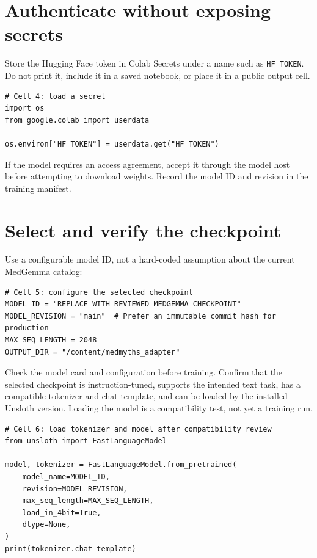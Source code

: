 \documentclass[11pt,oneside]{book}
\begin{document}
\section{Authenticate without exposing secrets}

Store the Hugging Face token in Colab Secrets under a name such as \texttt{HF\_TOKEN}. Do not print it, include it in a saved notebook, or place it in a public output cell.

\begin{verbatim}
# Cell 4: load a secret
import os
from google.colab import userdata

os.environ["HF_TOKEN"] = userdata.get("HF_TOKEN")
\end{verbatim}

If the model requires an access agreement, accept it through the model host before attempting to download weights. Record the model ID and revision in the training manifest.

\section{Select and verify the checkpoint}

Use a configurable model ID, not a hard-coded assumption about the current MedGemma catalog:

\begin{verbatim}
# Cell 5: configure the selected checkpoint
MODEL_ID = "REPLACE_WITH_REVIEWED_MEDGEMMA_CHECKPOINT"
MODEL_REVISION = "main"  # Prefer an immutable commit hash for production
MAX_SEQ_LENGTH = 2048
OUTPUT_DIR = "/content/medmyths_adapter"
\end{verbatim}

Check the model card and configuration before training. Confirm that the selected checkpoint is instruction-tuned, supports the intended text task, has a compatible tokenizer and chat template, and can be loaded by the installed Unsloth version. Loading the model is a compatibility test, not yet a training run.

\begin{verbatim}
# Cell 6: load tokenizer and model after compatibility review
from unsloth import FastLanguageModel

model, tokenizer = FastLanguageModel.from_pretrained(
    model_name=MODEL_ID,
    revision=MODEL_REVISION,
    max_seq_length=MAX_SEQ_LENGTH,
    load_in_4bit=True,
    dtype=None,
)
print(tokenizer.chat_template)
\end{verbatim}
\end{document}
